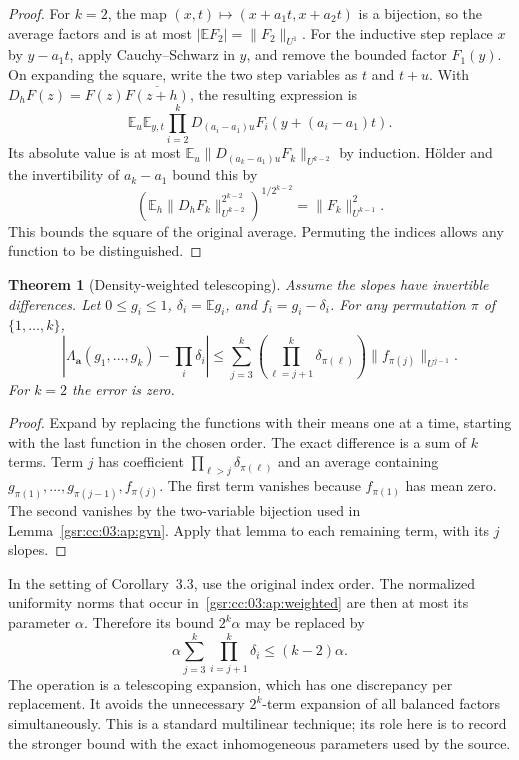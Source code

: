 \documentclass[11pt,letterpaper]{article}
\numberwithin{equation}{section}
\newtheorem{theorem}{Theorem}[section]
\theoremstyle{definition}
\theoremstyle{remark}
\newcommand{\E}{\mathbb E}
\newcommand{\1}{\mathbf 1}
\begin{document}
\begin{proof}
For $k=2$, the map $(x,t)\mapsto(x+a_1t,x+a_2t)$ is a bijection, so
the average factors and is at most $|\E F_2|=\|F_2\|_{U^1}$.
For the inductive step replace $x$ by $y-a_1t$, apply Cauchy--Schwarz
in $y$, and remove the bounded factor $F_1(y)$. On expanding the square,
write the two step variables as $t$ and $t+u$. With
$D_hF(z)=F(z)\overline{F(z+h)}$, the resulting expression is
\[
 \E_u\E_{y,t}\prod_{i=2}^k
       D_{(a_i-a_1)u}F_i(y+(a_i-a_1)t).
\]
Its absolute value is at most
$\E_u\|D_{(a_k-a_1)u}F_k\|_{U^{k-2}}$ by induction.
H\"older and the invertibility of $a_k-a_1$ bound this by
\[
 \left(\E_h\|D_hF_k\|_{U^{k-2}}^{2^{k-2}}\right)^{1/2^{k-2}}
       =\|F_k\|_{U^{k-1}}^2.
\]
This bounds the square of the original average. Permuting the indices
allows any function to be distinguished.
\end{proof}

\begin{theorem}[Density-weighted telescoping]
\label{gsr:cc:03:ap:telescoping}
Assume the slopes have invertible differences. Let $0\le g_i\le1$,
$\delta_i=\E g_i$, and $f_i=g_i-\delta_i$. For any permutation $\pi$
of $\{1,\ldots,k\}$,
\begin{equation}
 \left|\Lambda_{\boldsymbol a}(g_1,\ldots,g_k)-\prod_i\delta_i\right|
 \le\sum_{j=3}^k
       \left(\prod_{\ell=j+1}^k\delta_{\pi(\ell)}\right)
       \|f_{\pi(j)}\|_{U^{j-1}}.
 \label{gsr:cc:03:ap:weighted}
\end{equation}
For $k=2$ the error is zero.
\end{theorem}

\begin{proof}
Expand by replacing the functions with their means one at a time,
starting with the last function in the chosen order. The exact difference
is a sum of $k$ terms. Term $j$ has coefficient
$\prod_{\ell>j}\delta_{\pi(\ell)}$ and an average containing
$g_{\pi(1)},\ldots,g_{\pi(j-1)},f_{\pi(j)}$.
The first term vanishes because $f_{\pi(1)}$ has mean zero. The second
vanishes by the two-variable bijection used in Lemma~\ref{gsr:cc:03:ap:gvn}.
Apply that lemma to each remaining term, with its $j$ slopes.
\end{proof}

In the setting of Corollary~3.3, use the original index order. The
normalized uniformity norms that occur in~\eqref{gsr:cc:03:ap:weighted} are then
at most its parameter $\alpha$.
Therefore its bound $2^k\alpha$ may be replaced by
\[
 \alpha\sum_{j=3}^k\prod_{i=j+1}^k\delta_i\le(k-2)\alpha.
\]
The operation is a telescoping expansion, which has one discrepancy per
replacement. It avoids the unnecessary $2^k$-term expansion of all
balanced factors simultaneously. This is a standard multilinear
technique; its role here is to record the stronger bound with the exact
inhomogeneous parameters used by the source.
\end{document}
